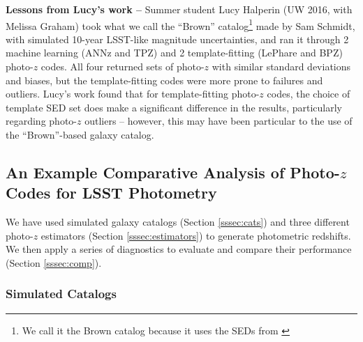 \documentclass[DM,lsstdraft,toc]{lsstdoc}
\begin{document}
\textbf{Lessons from Lucy's work --} Summer student Lucy Halperin (UW 2016, with Melissa Graham) took what we call the ``Brown'' catalog\footnote{We call it the Brown catalog because it uses the SEDs from \cite{2014ApJS..212...18B}} made by Sam Schmidt, with simulated 10-year LSST-like magnitude uncertainties, and ran it through 2 machine learning (ANNz and TPZ) and 2 template-fitting (LePhare and BPZ) photo-$z$ codes. All four returned sets of photo-$z$ with similar standard deviations and biases, but the template-fitting codes were more prone to failures and outliers. Lucy's work found that for template-fitting photo-$z$ codes, the choice of template SED set does make a significant difference in the results, particularly regarding photo-$z$ outliers -- however, this may have been particular to the use of the ``Brown''-based galaxy catalog.


\subsection{An Example Comparative Analysis of Photo-$z$ Codes for LSST Photometry}\label{ssec:sel_ex}

We have used simulated galaxy catalogs (Section \ref{sssec:cats}) and three different photo-$z$ estimators (Section \ref{sssec:estimators}) to generate photometric redshifts. We then apply a series of diagnostics to evaluate and compare their performance (Section \ref{sssec:comp}).


\subsubsection{Simulated Catalogs}\label{sssec:sel_ex_cats}
\end{document}
